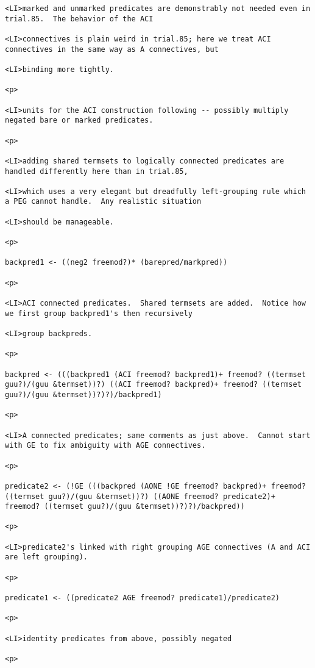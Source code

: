 \documentclass[12pt]{article}
\begin{document}
\begin{lstlisting}
<LI>marked and unmarked predicates are demonstrably not needed even in trial.85.  The behavior of the ACI

<LI>connectives is plain weird in trial.85; here we treat ACI connectives in the same way as A connectives, but

<LI>binding more tightly.

<p>

<LI>units for the ACI construction following -- possibly multiply negated bare or marked predicates.

<p>

<LI>adding shared termsets to logically connected predicates are handled differently here than in trial.85,

<LI>which uses a very elegant but dreadfully left-grouping rule which a PEG cannot handle.  Any realistic situation

<LI>should be manageable.

<p>

backpred1 <- ((neg2 freemod?)* (barepred/markpred))

<p>

<LI>ACI connected predicates.  Shared termsets are added.  Notice how we first group backpred1's then recursively

<LI>group backpreds.

<p>

backpred <- (((backpred1 (ACI freemod? backpred1)+ freemod? ((termset guu?)/(guu &termset))?) ((ACI freemod? backpred)+ freemod? ((termset guu?)/(guu &termset))?)?)/backpred1)

<p>

<LI>A connected predicates; same comments as just above.  Cannot start with GE to fix ambiguity with AGE connectives.

<p>

predicate2 <- (!GE (((backpred (AONE !GE freemod? backpred)+ freemod? ((termset guu?)/(guu &termset))?) ((AONE freemod? predicate2)+ freemod? ((termset guu?)/(guu &termset))?)?)/backpred))

<p>

<LI>predicate2's linked with right grouping AGE connectives (A and ACI are left grouping).

<p>

predicate1 <- ((predicate2 AGE freemod? predicate1)/predicate2)

<p>

<LI>identity predicates from above, possibly negated

<p>


\end{lstlisting}
\end{document}

